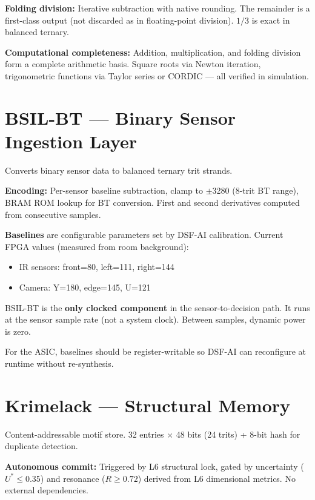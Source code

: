 \documentclass[11pt, a4paper]{article}
\begin{document}
\textbf{Folding division:} Iterative subtraction with native
rounding. The remainder is a first-class output (not discarded
as in floating-point division). $1/3$ is exact in balanced
ternary.

\textbf{Computational completeness:} Addition, multiplication,
and folding division form a complete arithmetic basis. Square
roots via Newton iteration, trigonometric functions via Taylor
series or CORDIC — all verified in simulation.

\section{BSIL-BT — Binary Sensor Ingestion Layer}

Converts binary sensor data to balanced ternary trit strands.

\textbf{Encoding:} Per-sensor baseline subtraction, clamp to
$\pm$3280 (8-trit BT range), BRAM ROM lookup for BT conversion.
First and second derivatives computed from consecutive samples.

\textbf{Baselines} are configurable parameters set by DSF-AI
calibration. Current FPGA values (measured from room background):
\begin{itemize}[nosep]
  \item IR sensors: front=80, left=111, right=144
  \item Camera: Y=180, edge=145, U=121
\end{itemize}

BSIL-BT is the \textbf{only clocked component} in the
sensor-to-decision path. It runs at the sensor sample rate
(not a system clock). Between samples, dynamic power is zero.

For the ASIC, baselines should be register-writable so DSF-AI
can reconfigure at runtime without re-synthesis.

\section{Krimelack — Structural Memory}

Content-addressable motif store. 32 entries $\times$ 48 bits
(24 trits) + 8-bit hash for duplicate detection.

\textbf{Autonomous commit:} Triggered by L6 structural lock,
gated by uncertainty ($U^* \leq 0.35$) and resonance
($R \geq 0.72$) derived from L6 dimensional metrics. No
external dependencies.
\end{document}
